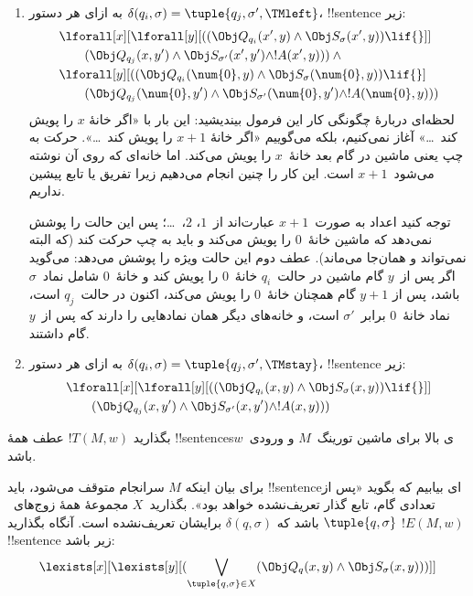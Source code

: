 \documentclass[../../../include/open-logic-section]{subfiles}
\begin{document}
\begin{enumerate}
\begin{enumerate}
\item {} به ازای هر دستور
  $\delta(q_i,\sigma)=\tuple{q_j,\sigma',\TMleft}$، !!{sentence}ٔ زیر:
\begin{align*}
& \lforall[x][\lforall[y][
    ((\Obj Q_{q_i}(x', y) \land \Obj S_{\sigma}(x', y)) \lif {}]]\\
& \qquad   (\Obj Q_{q_j}(x, y') \land \Obj S_{\sigma'}(x', y') \land
!A(x', y))) \land {}\\
& \lforall[y][((\Obj Q_{q_i}(\num{0}, y) \land \Obj S_{\sigma}(\num{0},
    y)) \lif {}]\\
& \qquad (\Obj Q_{q_j}(\num{0}, y') \land \Obj S_{\sigma'}(\num{0},
  y') \land !A(\num{0}, y)))
\end{align*}
لحظه‌ای دربارهٔ چگونگی کار این فرمول بیندیشید: این بار با «اگر خانهٔ
$x$ را پویش کند~\dots» آغاز نمی‌کنیم، بلکه می‌گوییم «اگر خانهٔ $x+1$
را پویش کند~\dots». حرکت به چپ یعنی ماشین در گام بعد خانهٔ~$x$ را
پویش می‌کند. اما خانه‌ای که روی آن نوشته می‌شود~$x+1$ است. این کار را
چنین انجام می‌دهیم زیرا تفریق یا تابع پیشین نداریم.

توجه کنید اعداد به صورت~$x+1$ عبارت‌اند از~$1$، $2$،~\dots؛ پس این
حالت را پوشش نمی‌دهد که ماشین خانهٔ~$0$ را پویش می‌کند و باید به چپ
حرکت کند (که البته نمی‌تواند و همان‌جا می‌ماند). عطف دوم این حالت
ویژه را پوشش می‌دهد: می‌گوید اگر پس از~$y$ گام ماشین در حالت~$q_i$
خانهٔ~$0$ را پویش کند و خانهٔ~$0$ شامل نماد~$\sigma$ باشد، پس از
$y+1$ گام همچنان خانهٔ~$0$ را پویش می‌کند، اکنون در حالت~$q_j$ است،
نماد خانهٔ~$0$ برابر~$\sigma'$ است، و خانه‌های دیگر همان نمادهایی را
دارند که پس از~$y$ گام داشتند.
\item {} به ازای هر دستور
  $\delta(q_i,\sigma)=\tuple{q_j,\sigma',\TMstay}$، !!{sentence}ٔ زیر:
\begin{align*}
& \lforall[x][\lforall[y][(
   (\Obj Q_{q_i}(x, y) \land \Obj S_{\sigma}(x, y)) \lif {}]] \\
&\qquad   (\Obj Q_{q_j}(x, y') \land \Obj S_{\sigma'}(x, y') \land
!A(x, y)))
\end{align*}
\end{enumerate}
\end{enumerate}
بگذارید $!T(M,w)$ عطف همهٔ !!{sentence}sی بالا برای ماشین تورینگ~$M$ و
ورودی~$w$ باشد.

برای بیان اینکه $M$ سرانجام متوقف می‌شود، باید !!{sentence}ای بیابیم که
بگوید «پس از تعدادی گام، تابع گذار تعریف‌نشده خواهد بود». بگذارید~$X$
مجموعهٔ همهٔ زوج‌های~$\tuple{q,\sigma}$ باشد که
$\delta(q,\sigma)$ برایشان تعریف‌نشده است. آنگاه بگذارید $!E(M,w)$
!!{sentence}ٔ زیر باشد:
\[
\lexists[x][\lexists[y][(\bigvee_{\tuple{q, \sigma} \in
      X}(\Obj Q_q(x, y) \land \Obj S_\sigma(x, y)))]]
\]
\end{document}
